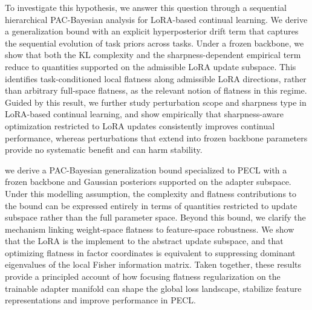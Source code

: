 \documentclass[10pt]{article} %
\begin{document}
To investigate this hypothesis, we answer this question through a sequential hierarchical PAC-Bayesian analysis for LoRA-based continual learning. We derive a generalization bound with an explicit hyperposterior drift term that captures the sequential evolution of task priors across tasks. Under a frozen backbone, we show that both the KL complexity and the sharpness-dependent empirical term reduce to quantities supported on the admissible LoRA update subspace. This identifies task-conditioned local flatness along admissible LoRA directions, rather than arbitrary full-space flatness, as the relevant notion of flatness in this regime. Guided by this result, we further study perturbation scope and sharpness type in LoRA-based continual learning, and show empirically that sharpness-aware optimization restricted to LoRA updates consistently improves continual performance, whereas perturbations that extend into frozen backbone parameters provide no systematic benefit and can harm stability.



we derive a PAC-Bayesian generalization bound specialized to PECL with a frozen backbone and Gaussian posteriors supported on the adapter subspace. Under this modelling assumption, the complexity and flatness contributions to the bound can be expressed entirely in terms of quantities restricted to update subspace rather than the full parameter space. Beyond this bound, we clarify the mechanism linking weight-space flatness to feature-space robustness. We show that the LoRA is the implement to the abstract update subspace, and that optimizing flatness in factor coordinates is equivalent to suppressing dominant eigenvalues of the local Fisher information matrix. Taken together, these results provide a principled account of how focusing flatness regularization on the trainable adapter manifold can shape the global loss landscape, stabilize feature representations and improve performance in PECL.


\end{document}
